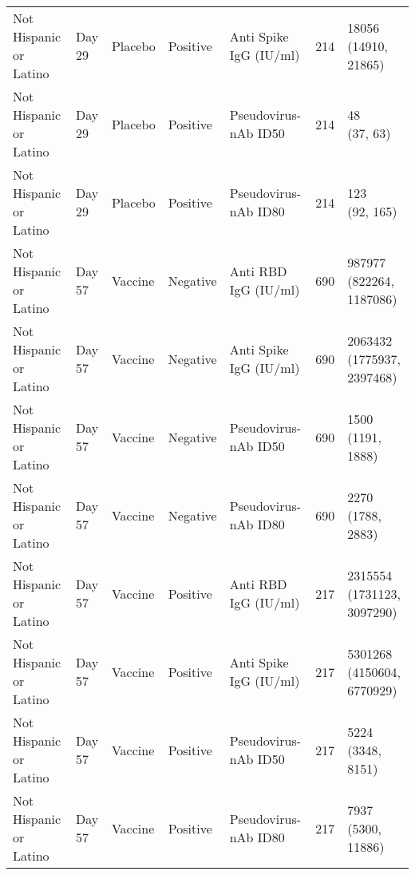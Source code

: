 \documentclass[]{book}
\theoremstyle{definition}
\theoremstyle{definition}
\theoremstyle{definition}
\newcommand{\1}{\mathbbm{1}}
\begin{document}
\begin{landscape}
\begin{ThreePartTable}
\begin{longtable}[t]{>{\raggedright\arraybackslash}p{7cm}llllll}
\hspace{1em}Not Hispanic or Latino & Day 29 & Placebo & Positive & Anti Spike IgG (IU/ml) & 214 & \makecell[l]{18056\\(14910, 21865)}\\
\hspace{1em}Not Hispanic or Latino & Day 29 & Placebo & Positive & Pseudovirus-nAb ID50 & 214 & \makecell[l]{48\\(37, 63)}\\
\hspace{1em}Not Hispanic or Latino & Day 29 & Placebo & Positive & Pseudovirus-nAb ID80 & 214 & \makecell[l]{123\\(92, 165)}\\
\hspace{1em}Not Hispanic or Latino & Day 57 & Vaccine & Negative & Anti RBD IgG (IU/ml) & 690 & \makecell[l]{987977\\(822264, 1187086)}\\
\hspace{1em}Not Hispanic or Latino & Day 57 & Vaccine & Negative & Anti Spike IgG (IU/ml) & 690 & \makecell[l]{2063432\\(1775937, 2397468)}\\
\hspace{1em}Not Hispanic or Latino & Day 57 & Vaccine & Negative & Pseudovirus-nAb ID50 & 690 & \makecell[l]{1500\\(1191, 1888)}\\
\hspace{1em}Not Hispanic or Latino & Day 57 & Vaccine & Negative & Pseudovirus-nAb ID80 & 690 & \makecell[l]{2270\\(1788, 2883)}\\
\hspace{1em}Not Hispanic or Latino & Day 57 & Vaccine & Positive & Anti RBD IgG (IU/ml) & 217 & \makecell[l]{2315554\\(1731123, 3097290)}\\
\hspace{1em}Not Hispanic or Latino & Day 57 & Vaccine & Positive & Anti Spike IgG (IU/ml) & 217 & \makecell[l]{5301268\\(4150604, 6770929)}\\
\hspace{1em}Not Hispanic or Latino & Day 57 & Vaccine & Positive & Pseudovirus-nAb ID50 & 217 & \makecell[l]{5224\\(3348, 8151)}\\
\hspace{1em}Not Hispanic or Latino & Day 57 & Vaccine & Positive & Pseudovirus-nAb ID80 & 217 & \makecell[l]{7937\\(5300, 11886)}\\

\end{longtable}
\end{ThreePartTable}
\end{landscape}
\end{document}
